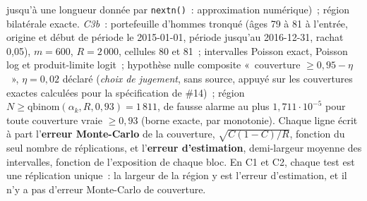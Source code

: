 \documentclass[a4paper,11pt]{article}
\newcommand{\code}[1]{\texttt{\small #1}}
\begin{document}
\begin{itemize}[leftmargin=*, itemsep=2pt]
    jusqu'à une longueur donnée par \code{nextn()}~: approximation
    numérique)~; région bilatérale exacte. \emph{C3b}~: portefeuille
    d'hommes tronqué (âges 79 à 81 à l'entrée, origine et début de période
    le 2015-01-01, période jusqu'au 2016-12-31, rachat 0,05), $m = 600$,
    $R = 2\,000$, cellules 80 et 81~; intervalles Poisson exact, Poisson log
    et produit-limite logit~; hypothèse nulle composite «~couverture
    $\ge 0{,}95 - \eta$~», $\eta = 0{,}02$ déclaré (\emph{choix de jugement},
    sans source, appuyé sur les couvertures exactes calculées pour la
    spécification de \#14)~; région $N \ge \text{qbinom}(\alpha_k, R,
    0{,}93) = 1\,811$, de fausse alarme au plus $1{,}711 \cdot 10^{-5}$ pour
    toute couverture vraie $\ge 0{,}93$ (borne exacte, par monotonie).
    Chaque ligne écrit à part l'\textbf{erreur Monte-Carlo} de la couverture,
    $\sqrt{C(1 - C)/R}$, fonction du seul nombre de réplications, et
    l'\textbf{erreur d'estimation}, demi-largeur moyenne des intervalles,
    fonction de l'exposition de chaque bloc. En C1 et C2, chaque test est une
    réplication unique~: la largeur de la région y est l'erreur
    d'estimation, et il n'y a pas d'erreur Monte-Carlo de couverture.
\end{itemize}
\end{document}
